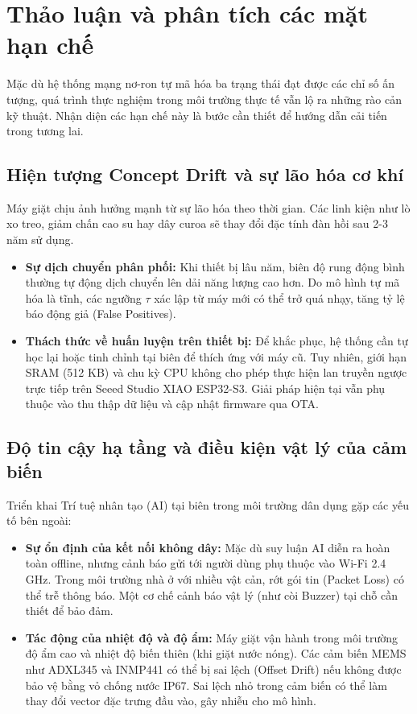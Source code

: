 \section{Thảo luận và phân tích các mặt hạn chế}
\label{sec:thao_luan_han_che}

Mặc dù hệ thống mạng nơ-ron tự mã hóa ba trạng thái đạt được các chỉ số ấn tượng, quá trình thực nghiệm trong môi trường thực tế vẫn lộ ra những rào cản kỹ thuật. Nhận diện các hạn chế này là bước cần thiết để hướng dẫn cải tiến trong tương lai.

\subsection{Hiện tượng Concept Drift và sự lão hóa cơ khí}

Máy giặt chịu ảnh hưởng mạnh từ sự lão hóa theo thời gian. Các linh kiện như lò xo treo, giảm chấn cao su hay dây curoa sẽ thay đổi đặc tính đàn hồi sau 2-3 năm sử dụng.

\begin{itemize}
    \item \textbf{Sự dịch chuyển phân phối:} Khi thiết bị lâu năm, biên độ rung động bình thường tự động dịch chuyển lên dải năng lượng cao hơn. Do mô hình tự mã hóa là tĩnh, các ngưỡng $\tau$ xác lập từ máy mới có thể trở quá nhạy, tăng tỷ lệ báo động giả (False Positives).
    
    \item \textbf{Thách thức về huấn luyện trên thiết bị:} Để khắc phục, hệ thống cần tự học lại hoặc tinh chỉnh tại biên để thích ứng với máy cũ. Tuy nhiên, giới hạn SRAM (512 KB) và chu kỳ CPU không cho phép thực hiện lan truyền ngược trực tiếp trên Seeed Studio XIAO ESP32-S3. Giải pháp hiện tại vẫn phụ thuộc vào thu thập dữ liệu và cập nhật firmware qua OTA.
\end{itemize}

\subsection{Độ tin cậy hạ tầng và điều kiện vật lý của cảm biến}

Triển khai Trí tuệ nhân tạo (AI) tại biên trong môi trường dân dụng gặp các yếu tố bên ngoài:

\begin{itemize}
    \item \textbf{Sự ổn định của kết nối không dây:} Mặc dù suy luận AI diễn ra hoàn toàn offline, nhưng cảnh báo gửi tới người dùng phụ thuộc vào Wi-Fi 2.4 GHz. Trong môi trường nhà ở với nhiều vật cản, rớt gói tin (Packet Loss) có thể trễ thông báo. Một cơ chế cảnh báo vật lý (như còi Buzzer) tại chỗ cần thiết để bảo đảm.
    
    \item \textbf{Tác động của nhiệt độ và độ ẩm:} Máy giặt vận hành trong môi trường độ ẩm cao và nhiệt độ biến thiên (khi giặt nước nóng). Các cảm biến MEMS như ADXL345 và INMP441 có thể bị sai lệch (Offset Drift) nếu không được bảo vệ bằng vỏ chống nước IP67. Sai lệch nhỏ trong cảm biến có thể làm thay đổi vector đặc trưng đầu vào, gây nhiễu cho mô hình.
\end{itemize}

